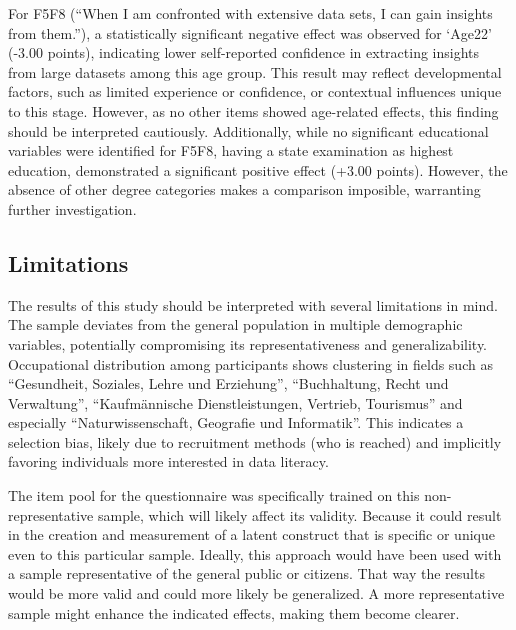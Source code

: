 \documentclass[
  12pt,
  a4paper,
  twoside]{article}
\begin{document}
For F5F8 (``When I am confronted with extensive data sets, I can gain insights from them.''), a statistically significant negative effect was observed for `Age22' (-3.00 points), indicating lower self-reported confidence in extracting insights from large datasets among this age group. This result may reflect developmental factors, such as limited experience or confidence, or contextual influences unique to this stage. However, as no other items showed age-related effects, this finding should be interpreted cautiously. Additionally, while no significant educational variables were identified for F5F8, having a state examination as highest education, demonstrated a significant positive effect (+3.00 points). However, the absence of other degree categories makes a comparison imposible, warranting further investigation.

\subsection{Limitations}\label{limitations}

The results of this study should be interpreted with several limitations in mind. The sample deviates from the general population in multiple demographic variables, potentially compromising its representativeness and generalizability. Occupational distribution among participants shows clustering in fields such as ``Gesundheit, Soziales, Lehre und Erziehung'', ``Buchhaltung, Recht und Verwaltung'', ``Kaufmännische Dienstleistungen, Vertrieb, Tourismus'' and especially ``Naturwissenschaft, Geografie und Informatik''. This indicates a selection bias, likely due to recruitment methods (who is reached) and implicitly favoring individuals more interested in data literacy.

The item pool for the questionnaire was specifically trained on this non-representative sample, which will likely affect its validity.
Because it could result in the creation and measurement of a latent construct that is specific or unique even to this particular sample.
Ideally, this approach would have been used with a sample representative of the general public or citizens.
That way the results would be more valid and could more likely be generalized.
A more representative sample might enhance the indicated effects, making them become clearer.
\end{document}
